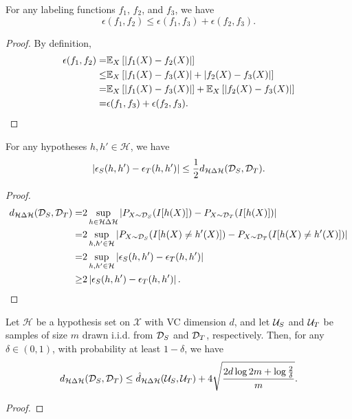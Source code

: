 \begin{lemma}\label{lem:triangle}
  For any labeling functions $f_1$, $f_2$, and $f_3$, we have
  \begin{equation}\label{eq:triangle}
    \epsilon(f_1,f_2) \leq \epsilon(f_1,f_3) + \epsilon(f_2,f_3).
  \end{equation}
\end{lemma}
\begin{proof}
  By definition,
  \begin{align}
    \epsilon(f_1, f_2)
    =   & \mathbb{E}_{X}\left[\left \lvert f_1(X)-f_2(X) \right \rvert\right] \label{eq:triangle_1}\\
    \leq& \mathbb{E}_{X}\left[\left \lvert f_1(X)-f_3(X) \right \rvert + \left \lvert f_2(X)-f_3(X) \right \rvert \right] \label{eq:triangle_2}\\
    =   & \mathbb{E}_{X}\left[\left \lvert f_1(X)-f_3(X) \right \rvert\right] + \mathbb{E}_{X}\left[\left \lvert f_2(X)-f_3(X) \right \rvert\right] \label{eq:triangle_3}\\
    =   & \epsilon(f_1, f_3) + \epsilon(f_2, f_3). \label{eq:triangle_4}
  \end{align}
\end{proof}

\begin{lemma}\label{lem:h_bound}
  For any hypotheses $h, h' \in \mathcal{H}$, we have
  \begin{equation}\label{eq:h_bound}
    \vert \epsilon_{S}(h,h') - \epsilon_{T}(h,h') \vert
    \leq
    \frac{1}{2} d_{\mathcal{H} \Delta \mathcal{H}}(\mathcal{D}_S,\mathcal{D}_T).
  \end{equation}
\end{lemma}
\begin{proof}
  \begin{align}
    d_{\mathcal{H} \Delta \mathcal{H}}(\mathcal{D}_S, \mathcal{D}_T)
    =& 2 \sup_{h \in \mathcal{H} \Delta \mathcal{H}} \left \lvert P_{X \sim \mathcal{D}_S}(I[h(X)]) - P_{X \sim \mathcal{D}_T}(I[h(X)]) \right \rvert \label{eq:h_bound_1}\\
    =& 2 \sup_{h, h' \in \mathcal{H}} \left \lvert P_{X \sim \mathcal{D}_S}(I[h(X) \ne h'(X)]) - P_{X \sim \mathcal{D}_T}(I[h(X) \ne h'(X)]) \right \rvert \label{eq:h_bound_2}\\
    =& 2 \sup_{h, h' \in \mathcal{H}} \left \lvert \epsilon_{S}(h, h') - \epsilon_{T}(h, h') \right \rvert \label{eq:h_bound_3}\\
    \geq& 2 \left \lvert \epsilon_{S}(h, h') - \epsilon_{T}(h, h') \right \rvert. \label{eq:h_bound_4}
  \end{align}
\end{proof}

\begin{lemma}\label{lem:unif_conv_h}
  Let $\mathcal{H}$ be a hypothesis set on $\mathcal{X}$ with VC dimension $d$, and let $\mathcal{U}_S$ and $\mathcal{U}_T$ be samples of size $m$ drawn i.i.d. from $\mathcal{D}_S$ and $\mathcal{D}_T$, respectively. Then, for any $\delta \in (0,1)$, with probability at least $1-\delta$, we have
  \begin{equation}\label{eq:unif_conv_h}
    d_{\mathcal{H} \Delta \mathcal{H}}(\mathcal{D}_S, \mathcal{D}_T)
    \leq
    \hat{d}_{\mathcal{H} \Delta \mathcal{H}}(\mathcal{U}_S, \mathcal{U}_T)
    +
    4 \sqrt{\frac{2d \log{2m} + \log{\frac{2}{\delta}}}{m}}.
  \end{equation}
\end{lemma}
\begin{proof}
\end{proof}

